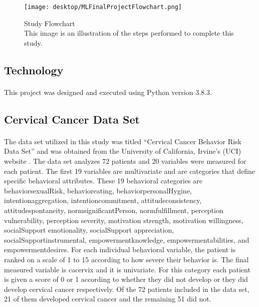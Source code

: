 \documentclass[10pt, oneside, twocolumn]{article}
\begin{document}
\begin{figure}[htbp]
\centering
\texttt{[image: desktop/MLFinalProjectFlowchart.png]}
\caption{Study Flowchart\\This image is an illustration of the steps performed to complete this study.}
\end{figure}



\subsection{Technology}
\paragraph{}
This project was designed and executed using Python version 3.8.3.
\subsection{Cervical Cancer Data Set}
\paragraph{}
The data set utilized in this study was titled “Cervical Cancer Behavior Risk Data Set” and was obtained from the University of California, Irvine’s  (UCI) website \cite{UCI}. The data set analyzes 72 patients and 20 variables were measured for each patient. The first 19 variables are multivariate and are categories that define specific behavioral attributes. These 19 behavioral categories are behavior\textunderscore sexualRisk, behavior\textunderscore eating, behavior\textunderscore personalHygine, intention\textunderscore aggregation, intention\textunderscore commitment, attitude\textunderscore consistency, attitude\textunderscore spontaneity, norm\textunderscore significantPerson, norm\textunderscore fulfillment, perception \textunderscore vulnerability, perception \textunderscore severity, motivation \textunderscore strength, motivation \textunderscore willingness, socialSupport \textunderscore emotionality, socialSupport \textunderscore appreciation, socialSupport\textunderscore instrumental, empowerment\textunderscore knowledge, empowerment\textunderscore abilities, and empowerment\textunderscore desires. For each individual behavioral variable, the patient is ranked on a scale of 1 to 15 according to how severe their behavior is. The final measured variable is ca\textunderscore cervix and it is univariate. For this category each patient is given a score of 0 or 1 according to whether they did not develop or they did develop cervical cancer respectively. Of the 72 patients included in the data set, 21 of them developed cervical cancer and the remaining 51 did not. 
\end{document}
